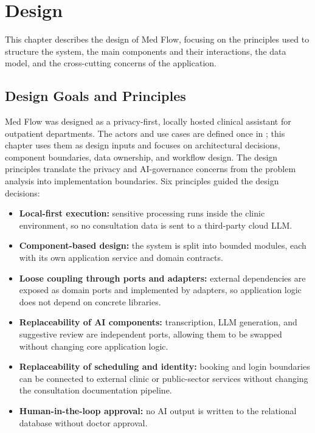 \section{Design}
\label{sec:design}

This chapter describes the design of Med Flow, focusing on the principles used to structure the system, the main components and their interactions, the data model, and the cross-cutting concerns of the application.

\subsection{Design Goals and Principles}
\label{subsec:design-goals-principles}

Med Flow was designed as a privacy-first, locally hosted clinical assistant for outpatient departments. The actors and use cases are defined once in ; this chapter uses them as design inputs and focuses on architectural decisions, component boundaries, data ownership, and workflow design. The design principles translate the privacy and AI-governance concerns from the problem analysis into implementation boundaries. Six principles guided the design decisions:

\begin{itemize}
  \item \textbf{Local-first execution:} sensitive processing runs inside the clinic environment, so no consultation data is sent to a third-party cloud LLM.
  \item \textbf{Component-based design:} the system is split into bounded modules, each with its own application service and domain contracts.
  \item \textbf{Loose coupling through ports and adapters:} external dependencies are exposed as domain ports and implemented by adapters, so application logic does not depend on concrete libraries.
  \item \textbf{Replaceability of AI components:} transcription, LLM generation, and suggestive review are independent ports, allowing them to be swapped without changing core application logic.
  \item \textbf{Replaceability of scheduling and identity:} booking and login boundaries can be connected to external clinic or public-sector services without changing the consultation documentation pipeline.
  \item \textbf{Human-in-the-loop approval:} no AI output is written to the relational database without doctor approval.
\end{itemize}

